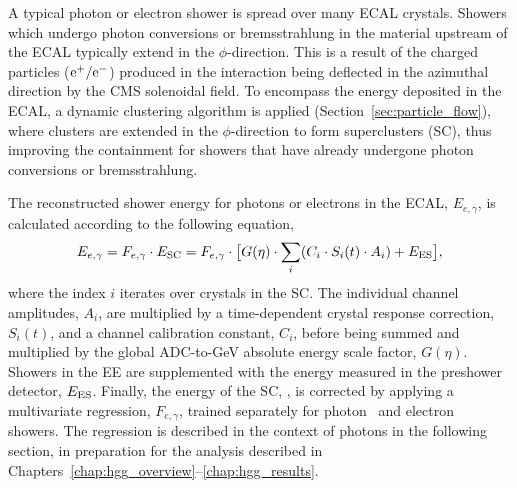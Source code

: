 A typical photon or electron shower is spread over many ECAL crystals. Showers which undergo photon conversions or bremsstrahlung in the material upstream of the ECAL typically extend in the $\phi$-direction. This is a result of the charged particles ($\rm{e}^+/\rm{e}^-$) produced in the interaction being deflected in the azimuthal direction by the CMS solenoidal field. To encompass the energy deposited in the ECAL, a dynamic clustering algorithm is applied (Section~\ref{sec:particle_flow}), where clusters are extended in the $\phi$-direction to form superclusters (SC), thus improving the containment for showers that have already undergone photon conversions or bremsstrahlung.

The reconstructed shower energy for photons or electrons in the ECAL, $E_{e,\gamma}$, is calculated according to the following equation,
\begin{equation}\label{eq:ecal_corrections}
    E_{e,\gamma} = F_{e,\gamma} \cdot E_{\rm{SC}} = F_{e,\gamma} \cdot \big[ G(\eta) \cdot \sum_i (C_i \cdot S_i(t) \cdot A_i) + E_{\rm{ES}} \big],
\end{equation}
\noindent
where the index $i$ iterates over crystals in the SC. The individual channel amplitudes, $A_i$, are multiplied by a time-dependent crystal response correction, $S_i(t)$, and a channel calibration constant, $C_i$, before being summed and multiplied by the global ADC-to-GeV absolute energy scale factor, $G(\eta)$. Showers in the EE are supplemented with the energy measured in the preshower detector, $E_{\rm{ES}}$. Finally, the energy of the SC, \Eraw, is corrected by applying a multivariate regression, $F_{e,\gamma}$, trained separately for photon~\cite{Khachatryan:2015iwa} and electron~\cite{Khachatryan:2015hwa} showers. The regression is described in the context of photons in the following section, in preparation for the \Hgg analysis described in Chapters~\ref{chap:hgg_overview}--\ref{chap:hgg_results}.

